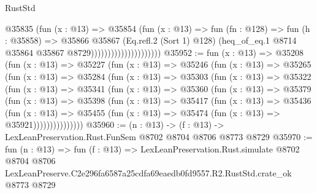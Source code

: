 \begin{lexlean}{RustStd}
\begin{coremodule}
                                      @35835
                                        (fun (x : @13) =>
                                        @35854
                                          (fun (x : @13) =>
                                          fun (fn : @128) =>
                                          fun (h : @35858) =>
                                          @35866
                                            @35867
                                            (Eq.refl.{2} (Sort 1) @128)
                                            (heq_of_eq.{1}
                                              @8714
                                              @35864
                                              @35867
                                              @8729)))))))))))))))))))))
@35952 := fun (x : @13) =>
  @35208
    (fun (x : @13) =>
    @35227
      (fun (x : @13) =>
      @35246
        (fun (x : @13) =>
        @35265
          (fun (x : @13) =>
          @35284
            (fun (x : @13) =>
            @35303
              (fun (x : @13) =>
              @35322
                (fun (x : @13) =>
                @35341
                  (fun (x : @13) =>
                  @35360
                    (fun (x : @13) =>
                    @35379
                      (fun (x : @13) =>
                      @35398
                        (fun (x : @13) =>
                        @35417
                          (fun (x : @13) =>
                          @35436
                            (fun (x : @13) =>
                            @35455 (fun (x : @13) => @35474 (fun (x : @13) => @35921)))))))))))))))
@35960 := (n : @13) -> (f : @13) -> LexLeanPreservation.Rust.FunSem @8702 @8704 @8706 @8773 @8729
@35970 := fun (n : @13) =>
  fun (f : @13) =>
  LexLeanPreservation.Rust.simulate
    @8702
    @8704
    @8706
    LexLeanPreserve.C2e296fa6587a25cdfa69eaedb0fd9557.R2.RustStd.crate_ok
    @8773
    @8729
\end{coremodule}
\end{lexlean}
